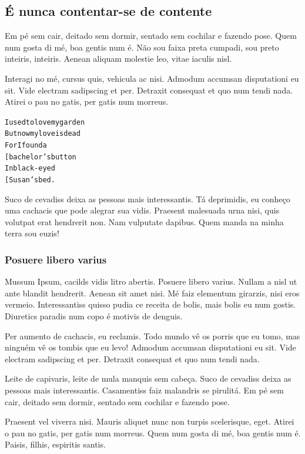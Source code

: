 \subsection{É nunca contentar-se de contente}


Em pé sem cair, deitado sem dormir, sentado sem cochilar e fazendo pose. Quem
num gosta di mé, boa gentis num é. Não sou faixa preta cumpadi, sou preto
inteiris, inteiris. Aenean aliquam molestie leo, vitae iaculis nisl.

Interagi no mé, cursus quis, vehicula ac nisi. Admodum accumsan disputationi eu
sit. Vide electram sadipscing et per. Detraxit consequat et quo num tendi nada.
Atirei o pau no gatis, per gatis num morreus.


\begin{alltt}\normalfont			%
I used to love my garden
But now my love is dead
   For I found a 
   			      		[ bachelor’s button
   In black-eyed 
              	        [ Susan’s bed.
\end{alltt}

Suco de cevadiss deixa as pessoas mais interessantis. Tá deprimidis, eu conheço
uma cachacis que pode alegrar sua vidis. Praesent malesuada urna nisi, quis
volutpat erat hendrerit non. Nam vulputate dapibus. Quem manda na minha terra
sou euzis!

\subsubsection{Posuere libero varius}

Mussum Ipsum, cacilds vidis litro abertis. Posuere libero varius. Nullam a nisl
ut ante blandit hendrerit. Aenean sit amet nisi. Mé faiz elementum girarzis,
nisi eros vermeio. Interessantiss quisso pudia ce receita de bolis, mais bolis
eu num gostis. Diuretics paradis num copo é motivis de denguis.

Per aumento de cachacis, eu reclamis. Todo mundo vê os porris que eu tomo, mas
ninguém vê os tombis que eu levo! Admodum accumsan disputationi eu sit. Vide
electram sadipscing et per. Detraxit consequat et quo num tendi nada.


Leite de capivaris, leite de mula manquis sem cabeça. Suco de cevadiss deixa as
pessoas mais interessantis. Casamentiss faiz malandris se pirulitá. Em pé sem
cair, deitado sem dormir, sentado sem cochilar e fazendo pose.

Praesent vel viverra nisi. Mauris aliquet nunc non turpis scelerisque, eget.
Atirei o pau no gatis, per gatis num morreus. Quem num gosta di mé, boa gentis
num é. Paisis, filhis, espiritis santis.

